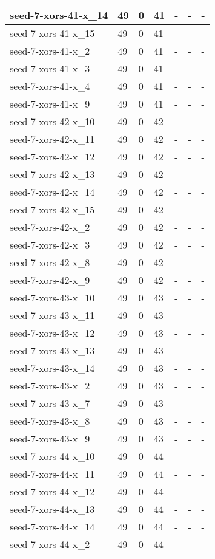 \begin{scriptsize}
\begin{longtable}{|p{5cm}|l|l|l|l|l|l|}
seed-7-xors-41-x\_14&49&0&41&-&-&- \\ \hline 
seed-7-xors-41-x\_15&49&0&41&-&-&- \\ \hline 
seed-7-xors-41-x\_2&49&0&41&-&-&- \\ \hline 
seed-7-xors-41-x\_3&49&0&41&-&-&- \\ \hline 
seed-7-xors-41-x\_4&49&0&41&-&-&- \\ \hline 
seed-7-xors-41-x\_9&49&0&41&-&-&- \\ \hline 
seed-7-xors-42-x\_10&49&0&42&-&-&- \\ \hline 
seed-7-xors-42-x\_11&49&0&42&-&-&- \\ \hline 
seed-7-xors-42-x\_12&49&0&42&-&-&- \\ \hline 
seed-7-xors-42-x\_13&49&0&42&-&-&- \\ \hline 
seed-7-xors-42-x\_14&49&0&42&-&-&- \\ \hline 
seed-7-xors-42-x\_15&49&0&42&-&-&- \\ \hline 
seed-7-xors-42-x\_2&49&0&42&-&-&- \\ \hline 
seed-7-xors-42-x\_3&49&0&42&-&-&- \\ \hline 
seed-7-xors-42-x\_8&49&0&42&-&-&- \\ \hline 
seed-7-xors-42-x\_9&49&0&42&-&-&- \\ \hline 
seed-7-xors-43-x\_10&49&0&43&-&-&- \\ \hline 
seed-7-xors-43-x\_11&49&0&43&-&-&- \\ \hline 
seed-7-xors-43-x\_12&49&0&43&-&-&- \\ \hline 
seed-7-xors-43-x\_13&49&0&43&-&-&- \\ \hline 
seed-7-xors-43-x\_14&49&0&43&-&-&- \\ \hline 
seed-7-xors-43-x\_2&49&0&43&-&-&- \\ \hline 
seed-7-xors-43-x\_7&49&0&43&-&-&- \\ \hline 
seed-7-xors-43-x\_8&49&0&43&-&-&- \\ \hline 
seed-7-xors-43-x\_9&49&0&43&-&-&- \\ \hline 
seed-7-xors-44-x\_10&49&0&44&-&-&- \\ \hline 
seed-7-xors-44-x\_11&49&0&44&-&-&- \\ \hline 
seed-7-xors-44-x\_12&49&0&44&-&-&- \\ \hline 
seed-7-xors-44-x\_13&49&0&44&-&-&- \\ \hline 
seed-7-xors-44-x\_14&49&0&44&-&-&- \\ \hline 
seed-7-xors-44-x\_2&49&0&44&-&-&- \\ \hline 

\end{longtable}
\end{scriptsize}
